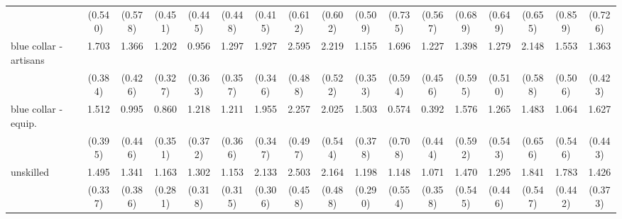 {\begin{tabular}{l*{16}{c}}
                    &     (0.540)         &     (0.578)         &     (0.451)         &     (0.445)         &     (0.448)         &     (0.415)         &     (0.612)         &     (0.602)         &     (0.509)         &     (0.735)         &     (0.567)         &     (0.689)         &     (0.649)         &     (0.655)         &     (0.859)         &     (0.726)         \\
[1em]
blue collar - artisans&       1.703\sym{***}&       1.366\sym{**} &       1.202\sym{***}&       0.956\sym{**} &       1.297\sym{***}&       1.927\sym{***}&       2.595\sym{***}&       2.219\sym{***}&       1.155\sym{**} &       1.696\sym{**} &       1.227\sym{**} &       1.398\sym{*}  &       1.279\sym{*}  &       2.148\sym{***}&       1.553\sym{**} &       1.363\sym{**} \\
                    &     (0.384)         &     (0.426)         &     (0.327)         &     (0.363)         &     (0.357)         &     (0.346)         &     (0.488)         &     (0.522)         &     (0.353)         &     (0.594)         &     (0.456)         &     (0.595)         &     (0.510)         &     (0.588)         &     (0.506)         &     (0.423)         \\
[1em]
blue collar - equip.&       1.512\sym{***}&       0.995\sym{*}  &       0.860\sym{*}  &       1.218\sym{**} &       1.211\sym{***}&       1.955\sym{***}&       2.257\sym{***}&       2.025\sym{***}&       1.503\sym{***}&       0.574         &       0.392         &       1.576\sym{**} &       1.265\sym{*}  &       1.483\sym{*}  &       1.064         &       1.627\sym{***}\\
                    &     (0.395)         &     (0.446)         &     (0.351)         &     (0.372)         &     (0.366)         &     (0.347)         &     (0.497)         &     (0.544)         &     (0.378)         &     (0.708)         &     (0.444)         &     (0.592)         &     (0.543)         &     (0.656)         &     (0.546)         &     (0.443)         \\
[1em]
unskilled           &       1.495\sym{***}&       1.341\sym{***}&       1.163\sym{***}&       1.302\sym{***}&       1.153\sym{***}&       2.133\sym{***}&       2.503\sym{***}&       2.164\sym{***}&       1.198\sym{***}&       1.148\sym{*}  &       1.071\sym{**} &       1.470\sym{**} &       1.295\sym{**} &       1.841\sym{***}&       1.783\sym{***}&       1.426\sym{***}\\
                    &     (0.337)         &     (0.386)         &     (0.281)         &     (0.318)         &     (0.315)         &     (0.306)         &     (0.458)         &     (0.488)         &     (0.290)         &     (0.554)         &     (0.358)         &     (0.545)         &     (0.446)         &     (0.547)         &     (0.442)         &     (0.373)         \\

\end{tabular}}
